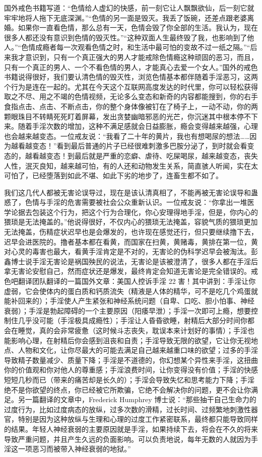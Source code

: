 国外戒色书籍写道：“色情给人虚幻的快感，前一刻它让人飘飘欲仙，后一刻它就牢牢地将人拖下无底深渊。”“色情的另一面是毁灭。我丢了饭碗，还差点跟老婆离婚。如果你一直看色情，那么总有一天，色情会毁了你全部的生活。我认为，现在很多人都还没有意识到色情的毁灭性。”“这种双面人生最终毁了我，也影响到了他人。”“色情成瘾者每一次观看色情之时，和生活中最可怕的变故不过一纸之隔。”“后来我才意识到，只有一个真正强大的男人才能戒除色情瘾这种顽固的恶习，而且，只有一个真正的男人、一个不看色情的男人，才能真心去爱一个女人。”国外的戒色书籍说得很好，我们要认清色情的毁灭性，浏览色情基本都伴随着手淫恶习，这两个行为是连在一起的。尤其在今天这个互联网高度发达的时代里，你可以轻松获得取之不尽、用之不竭的色情视频，无论多么变态和新奇的内容都能搜到，你的右手食指点击、点击、不断点击，你的整个身体像被钉在了椅子上，一动不动，你的两颗眼珠目不转睛死死盯着屏幕，发出贪婪幽暗邪恶的光芒，你沉迷其中根本停不下来。随着手淫次数的增加，这种不满足感就会日益膨胀，瘾会变得越来越强，心理也会越来越变态。一位戒友说：“我看了二十年的黄片，我也有想喝尿的想法……因为越看越变态！”看到最后普通的片子已经很难刺激多巴胺分泌了，到时就会看变态的，越看越变态！到最后就是严重的恋癖、虐待、吃屎喝尿，越来越变态，丧失人性，泯灭良知，越来越可怕，有的人还和动物发生关系，简直骇人听闻，实在太可怕了，已经堕落到如此不堪、如此下劣的地步了，连畜生都不如了。

我们这几代人都被无害论误导过，现在是该认清真相了，不能再被无害论误导和蛊惑了，色情与手淫的危害需要被社会公众重新认识。一位戒友说：“你拿出一堆医学论据去包装这个行为，把这个行为合理化，你心安理得地手淫，但是，你内心的猥琐是无法掩盖的。”他说得很好，不仅内心的猥琐无法掩盖，容貌气质的猥琐更加无法掩盖，伤精症状迟早也是会爆发的，也许现在感觉还行，但只要继续撸下去，迟早会进医院的。撸者基本都在看黄，而国家在扫黄，黄赌毒，黄排在第一位，黄对心灵的毒害也最大，看黄手淫肯定是不对的，无害论的伪科学迟早会被淘汰。彭鑫博士说手淫无害论是祸国殃民的说法，无害论是该被澄清了，很多人都在手淫后拿无害论安慰自己，然而症状还是爆发，最终肯定会知道无害论是完全错误的。戒色吧翻译团队翻译的一篇国外文章：美国人控诉手淫 22 害！其中讲到：手淫让你虚弱，它会使体内的蛋白质和钙质流失（精液是人体的精华，可不是吃几个鸡蛋就能补回来的）；手淫使人产生紧张和神经系统问题（自卑、口吃、胆小怕事、神经衰弱）；手淫是勃起障碍的一个主要原因（阳痿早泄）；手淫一次即可上瘾，想要控制住几乎没可能（手淫极具成瘾性）；手淫让人昏昏欲睡，射精后大部分时间你都会在睡觉，真的会非常疲惫（这时候斗志丧失，耽误本来计划好的事情）；手淫也能影响心理，在射精后你会感到沮丧和自责；手淫导致无限的欲望，它让你无视地点、人物和文化，让你尽最大的可能去满足自己越来越重口味的欲望；过多的手淫导致精子数量减少、质量下降；手淫是不道德的，你幻想某个异性来手淫，这扭曲你的价值观和你对他人的尊重感；手淫浪费时间，让你变得没有价值；手淫的快感短短几秒而已（带来的痛苦却是长久的）；手淫会导致失忆和思考能力下降；手淫绝不是你欲望的终点，你已经被它所欺骗，它绝不会解决你的问题，更不会让你满足。另一篇翻译的文章中，Frederick Humphrey 博士说：“那些抽干自己生命力的过度行为，比如过度病态的放纵，过多次数的滑精，过长时间、过频繁地刺激性器官，特别是因为这种放纵与生理和心理的过度工作紧密联系，最终都只能导致同样的结果。年轻人神经衰弱的主要原因就是手淫，如果持续下去，将会在不久的将来导致严重问题，并且产生久远的负面影响。可以负责地说，每年无数的人就因为手淫这一项恶习而被带入神经衰弱的地狱。”

